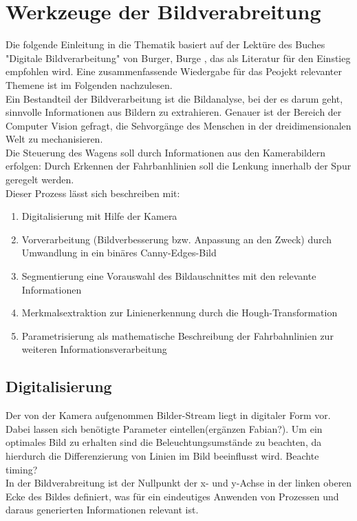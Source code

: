 \section{Werkzeuge der Bildverabreitung}
Die folgende Einleitung in die Thematik basiert auf der Lektüre des Buches
"Digitale Bildverarbeitung" von Burger, Burge \citep{burgeDigitBild}, das als 
Literatur für den Einstieg empfohlen wird. Eine zusammenfassende Wiedergabe für 
das Peojekt relevanter Themene ist im Folgenden nachzulesen.\\
Ein Bestandteil der Bildverarbeitung ist die Bildanalyse, bei der es darum geht,
sinnvolle Informationen aus Bildern zu extrahieren. Genauer ist der Bereich der
Computer Vision gefragt, die Sehvorgänge des Menschen in der dreidimensionalen Welt
zu mechanisieren.\\
Die Steuerung des Wagens soll durch Informationen aus den Kamerabildern
erfolgen: Durch Erkennen der Fahrbanhlinien soll die Lenkung innerhalb der Spur
geregelt werden.\\
Dieser Prozess lässt sich beschreiben mit:
\begin{enumerate}
  \item Digitalisierung mit Hilfe der Kamera
  \item Vorverarbeitung (Bildverbesserung bzw. Anpassung an den Zweck) durch
    Umwandlung in ein binäres Canny-Edges-Bild
  \item Segmentierung eine Vorauswahl des Bildauschnittes mit den relevante
    Informationen
  \item Merkmalsextraktion zur Linienerkennung durch die Hough-Transformation
  \item Parametrisierung als mathematische  Beschreibung der Fahrbahnlinien zur
    weiteren Informationsverarbeitung
\end{enumerate}

\subsection{Digitalisierung}
Der von der Kamera aufgenommen Bilder-Stream liegt in digitaler Form vor. Dabei lassen
sich benötigte Parameter eintellen(ergänzen Fabian?). Um ein optimales Bild zu
erhalten sind die Beleuchtungsumstände zu beachten, da hierdurch die
Differenzierung von Linien im Bild beeinflusst wird. Beachte timing? \\
In der Bildverabreitung ist der Nullpunkt der x- und y-Achse in der linken
oberen Ecke des Bildes definiert, was für ein eindeutiges Anwenden von Prozessen
und daraus generierten Informationen relevant ist.

